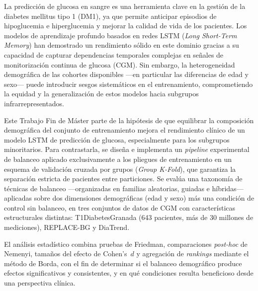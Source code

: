 La predicción de glucosa en sangre es una herramienta clave en la gestión de la diabetes mellitus tipo 1 (DM1), ya que permite anticipar episodios de hipoglucemia e hiperglucemia y mejorar la calidad de vida de los pacientes. Los modelos de aprendizaje profundo basados en redes LSTM (\textit{Long Short-Term Memory}) han demostrado un rendimiento sólido en este dominio gracias a su capacidad de capturar dependencias temporales complejas en señales de monitorización continua de glucosa (CGM). Sin embargo, la heterogeneidad demográfica de las cohortes disponibles —en particular las diferencias de edad y sexo— puede introducir sesgos sistemáticos en el entrenamiento, comprometiendo la equidad y la generalización de estos modelos hacia subgrupos infrarrepresentados.

Este Trabajo Fin de Máster parte de la hipótesis de que equilibrar la composición demográfica del conjunto de entrenamiento mejora el rendimiento clínico de un modelo LSTM de predicción de glucosa, especialmente para los subgrupos minoritarios. Para contrastarla, se diseña e implementa un \textit{pipeline} experimental de balanceo aplicado exclusivamente a los pliegues de entrenamiento en un esquema de validación cruzada por grupos (\textit{Group K-Fold}), que garantiza la separación estricta de pacientes entre particiones. Se evalúa una taxonomía de técnicas de balanceo —organizadas en familias aleatorias, guiadas e híbridas— aplicadas sobre dos dimensiones demográficas (edad y sexo) más una condición de control sin balanceo, en tres conjuntos de datos de CGM con características estructurales distintas: T1DiabetesGranada (643 pacientes, más de 30 millones de mediciones), REPLACE-BG y DiaTrend.

El análisis estadístico combina pruebas de Friedman, comparaciones \textit{post-hoc} de Nemenyi, tamaños del efecto de Cohen's~$d$ y agregación de \textit{rankings} mediante el método de Borda, con el fin de determinar si el balanceo demográfico produce efectos significativos y consistentes, y en qué condiciones resulta beneficioso desde una perspectiva clínica.
